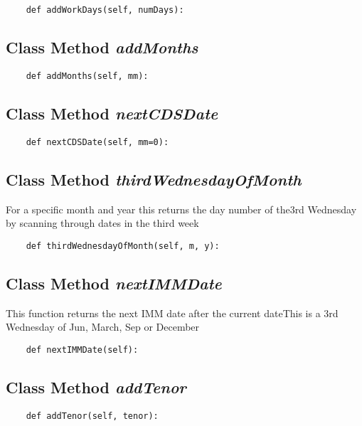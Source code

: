 \documentclass[twoside,11pt]{book}
\begin{document}
\begin{lstlisting}
    def addWorkDays(self, numDays):
\end{lstlisting}

\subsection{Class Method {\it addMonths}}


\begin{lstlisting}
    def addMonths(self, mm):
\end{lstlisting}

\subsection{Class Method {\it nextCDSDate}}


\begin{lstlisting}
    def nextCDSDate(self, mm=0):
\end{lstlisting}

\subsection{Class Method {\it thirdWednesdayOfMonth}}
For a specific month and year this returns the day number of the3rd Wednesday by scanning through dates in the third week 

\begin{lstlisting}
    def thirdWednesdayOfMonth(self, m, y):
\end{lstlisting}

\subsection{Class Method {\it nextIMMDate}}
This function returns the next IMM date after the current dateThis is a 3rd Wednesday of Jun, March, Sep or December 

\begin{lstlisting}
    def nextIMMDate(self):
\end{lstlisting}

\subsection{Class Method {\it addTenor}}


\begin{lstlisting}
    def addTenor(self, tenor):
\end{lstlisting}
\end{document}

